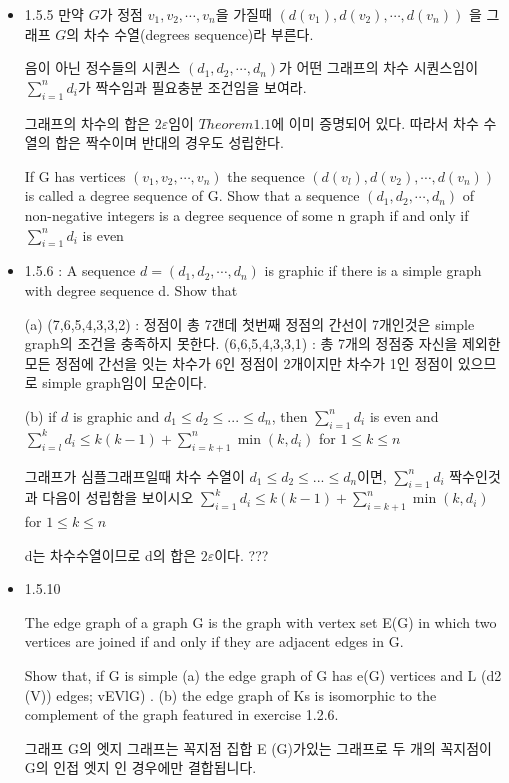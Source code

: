 \documentclass{oblivoir}
\begin{document}
\begin{itemize}
    \item 1.5.5
    만약 $G$가 정점 $v_1, v_2, \cdots , v_n$을 가질때 $(d(v_1), d(v_2), \cdots , d(v_n))$ 을 그래프 $G$의 차수 수열(degrees sequence)라 부른다.
    
    음이 아닌 정수들의 시퀀스 $(d_1, d_2, \cdots , d_n)$가 어떤 그래프의 차수 시퀀스임이 $\sum_{i=1}^n d_i$가 짝수임과 필요충분 조건임을 보여라.

    그래프의 차수의 합은 $2\varepsilon$임이  $Theorem1.1$에 이미 증명되어 있다. 따라서 차수 수열의 합은 짝수이며 반대의 경우도 성립한다.
    
    
    If G has vertices $(v_1, v_2, \cdots , v_n)$ the sequence $(d(v_l), d(v_2), \cdots , d(v_n))$ is called a degree sequence of G. 
    Show that a sequence $(d_1, d_2, \cdots , d_n)$ of non-negative integers is a degree sequence of some n
    graph if and only if $\sum_{i=1}^n d_i$ is even

    \item 1.5.6 : A sequence $d = (d_1, d_2 , \cdots , d_n)$ is graphic if there is a simple graph with degree sequence d. Show that

    (a) (7,6,5,4,3,3,2) : 정점이 총 7갠데 첫번째 정점의 간선이 7개인것은 simple graph의 조건을 충족하지 못한다.
    (6,6,5,4,3,3,1) : 총 7개의 정점중 자신을 제외한 모든 정점에 간선을 잇는 차수가 6인 정점이 2개이지만 차수가 1인 정점이 있으므로  simple graph임이 모순이다.

    (b) if $d$ is graphic and $d_1 \le d_2 \le ... \le d_n$, then $\sum_{i=1}^{n} d_i$ is even and $\sum_{i=l}^{k} d_i \le k(k -1)+\sum_{i=k+1}^{n}\min(k, d_i)$ for $1 \le k \le n$

    그래프가 심플그래프일때 차수 수열이 $d_1 \le d_2 \le ... \le d_n$이면,  $\sum_{i=1}^{n} d_i$ 짝수인것과 다음이 성립함을 보이시오
    $\sum_{i=1}^{k} d_i \le k(k -1)+\sum_{i=k+1}^{n}\min(k, d_i)$ for $1 \le k \le n$
    
    d는 차수수열이므로 d의 합은 $2\varepsilon$이다.
???
    \item 1.5.10
    
    The edge graph of a graph G is the graph with vertex set E(G) in
    which two vertices are joined if and only if they are adjacent edges in G. 
    
    Show that, if G is simple
    (a) the edge graph of G has e(G) vertices and L (d2 (V)) edges; vEVlG) .
    (b) the edge graph of Ks is isomorphic to the complement of the
    graph featured in exercise 1.2.6.

    그래프 G의 엣지 그래프는 꼭지점 집합 E (G)가있는 그래프로 두 개의 꼭지점이 G의 인접 엣지 인 경우에만 결합됩니다.




\end{itemize}
\end{document}
